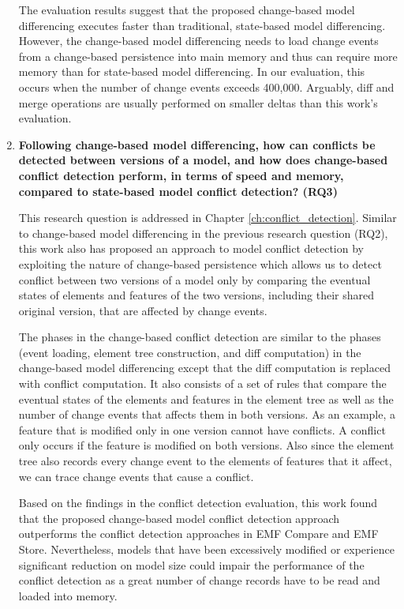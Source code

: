 \begin{enumerate}
 The evaluation results suggest that the proposed change-based model differencing executes faster than traditional, state-based model differencing.
 However, the change-based model differencing needs to load change events from a change-based persistence into main memory and thus can require more memory than for state-based model differencing. In our evaluation, this occurs when the number of change events exceeds 400,000. Arguably, diff and merge operations are usually performed on smaller deltas than this work's evaluation.
  
  \item \textbf{Following change-based model differencing, how can conflicts be detected between versions of a model, and  how does change-based conflict detection perform, in terms of speed and memory, compared to state-based model conflict detection? (RQ3)} 
  
  This research question is addressed in Chapter \ref{ch:conflict_detection}.  Similar to change-based model differencing in the previous research question (RQ2), this work also has proposed an approach to model conflict detection by exploiting the nature of change-based persistence which allows us to detect conflict between two versions of a model only by comparing the eventual states of elements and features of the two versions, including their shared original version, that are affected by change events.
  
  The phases in the change-based conflict detection are similar to the phases (event loading, element tree construction, and diff computation) in the change-based model differencing except that the diff computation is replaced with conflict computation. It also consists of a set of rules that compare the eventual states of the elements and features in the element tree as well as the number of change events that affects them in both versions. As an example, a feature that is modified only in one version cannot have conflicts. A conflict only occurs if the feature is modified on both versions. Also since the element tree also records every change event to the elements of features that it affect, we can trace change events that cause a conflict.
  
Based on the findings in the conflict detection evaluation, this work found that the proposed change-based model conflict detection approach outperforms the conflict detection approaches in EMF Compare and EMF Store. Nevertheless, models that have been excessively modified or experience significant reduction on model size could impair the performance of the conflict detection as a great number of change records have to be read and loaded into memory.
  
\end{enumerate}

